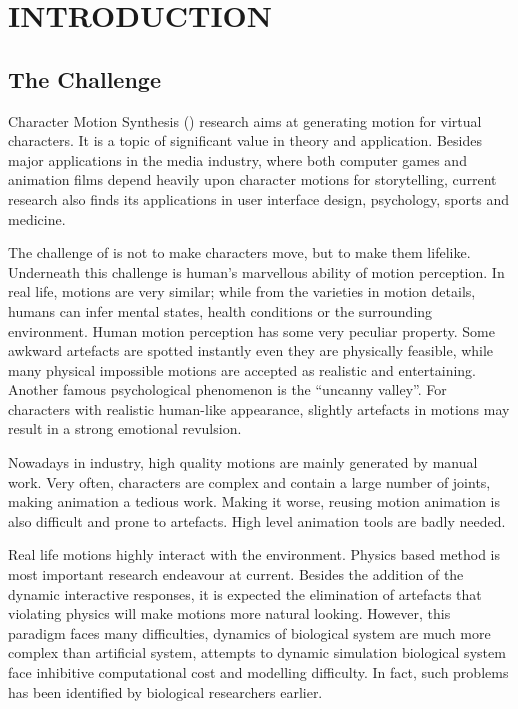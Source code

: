 \chapter{INTRODUCTION}
\label{chap:intro}

\graphicspath{{Introduction/IntroductionFigs/EPS/}{Introduction/IntroductionFigs/}}

\section{The Challenge}
Character Motion Synthesis (\cms) research aims at generating motion for virtual characters.
It is a topic of significant value in theory and application. 
Besides major applications in the media industry, where both computer games and animation films depend heavily upon character motions for storytelling, 
current research also finds its applications in user interface design, psychology, sports and medicine.

The challenge of \cms  is not to make characters move, but  to make them lifelike. 
Underneath this challenge is human's marvellous ability of motion perception. 
In real life, motions are very similar; 
while from the varieties in motion details, humans can infer mental states, health conditions or the surrounding environment.
Human motion perception has some very peculiar property.
Some awkward artefacts are spotted instantly even they are physically feasible, while many physical impossible motions are accepted as realistic and entertaining. 
Another famous psychological phenomenon is the ``uncanny valley''.
For characters with realistic human-like appearance, slightly artefacts in motions may result in a strong emotional revulsion.



Nowadays in industry, high quality motions are mainly generated by manual work. 
Very often, characters are complex and contain a large number of joints, making animation a tedious work.
Making it worse, reusing motion animation is also difficult and prone to artefacts.
High level animation tools are badly needed. 



Real life motions highly interact with the environment.
Physics based method  is most important research endeavour at current.
Besides  the addition of the dynamic interactive responses, it is  expected  the elimination of  artefacts that violating physics  will make motions more natural looking.
However, this paradigm faces many difficulties, dynamics of biological system are much more complex than artificial system,  attempts to dynamic simulation biological system face inhibitive  computational cost and modelling difficulty.
In fact, such problems has been identified by biological researchers earlier.







